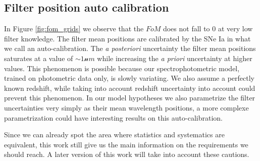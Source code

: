 \documentclass[\docopts]{\docclass}
\begin{document}
\subsection{Filter position auto calibration}
In Figure \ref{fig:fom_grids} we observe that the $FoM$ does not fall to 0 at very low filter knowledge.
The filter mean positions are calibrated by the SNe Ia in what we call an auto-calibration.
The \textit{a posteriori} uncertainty the filter mean positions saturates at a value of $\sim 1 \mathcal nm$ while increasing the \textit{a priori} uncertainty at higher values.
This phenomenon is possible because our spectrophotometric model, trained on photometric data only, is slowly variating.
We also assume a perfectly known redshift, while taking into account redshift uncertainty into account could prevent this phenomenon.
In our model hypotheses we also parametrize the filter uncertainties very simply as their mean wavelength positions, a more complexe parametrization could have interesting results on this auto-calibration.

Since we can already spot the area where statistics and systematics are equivalent, this work still give us the main information on the requirements we should reach.
A later version of this work will take into account these cautions.


\end{document}
